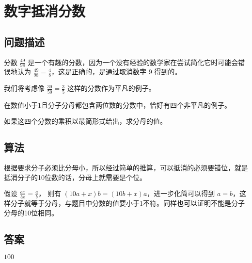 \section{数字抵消分数}
\subsection{问题描述}
\begin{tcolorbox}
	分数 \( \frac{49}{98} \) 是一个有趣的分数，因为一个没有经验的数学家在尝试简化它时可能会错误地认为 \( \frac{49}{98} = \frac{4}{8} \)，这是正确的，是通过取消数字 9 得到的。

	我们将考虑像 \( \frac{30}{50} = \frac{3}{5} \) 这样的分数作为平凡的例子。

	在数值小于1且分子分母都包含两位数的分数中，恰好有四个非平凡的例子。

	如果这四个分数的乘积以最简形式给出，求分母的值。
\end{tcolorbox}

\subsection{算法}
根据要求分子必须比分母小，所以经过简单的推算，可以抵消的必须要错位，就是抵消分子的10位数的话，分母上就需要是个位。

假设 \( \frac{ax}{bx} = \frac{a}{b} \)， 则有 \(  (10a + x) b = (10b + x) a \)，进一步化简可以得到 \( a = b
\)，这样分子就等于分母，与题目中分数的值要小于1不符。同样也可以证明不能是分子分母的10位相同。

\subsection{答案}
\( 100 \)
